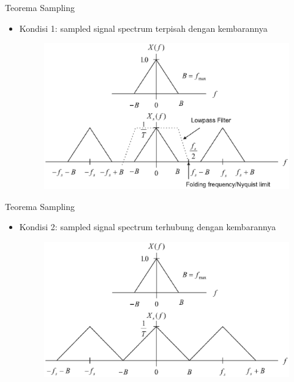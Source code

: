 \documentclass[pdflatex,compress,mathserif]{beamer}
\begin{document}
\begin{frame}{Teorema Sampling}
    \begin{itemize}
        \item Kondisi 1: sampled signal spectrum terpisah dengan kembarannya
        \begin{figure}
            \includegraphics[width=\linewidth]{./img/img09}
            \label{img:09}
        \end{figure}
    \end{itemize}
\end{frame}

\begin{frame}{Teorema Sampling}
    \begin{itemize}
        \item Kondisi 2: sampled signal spectrum terhubung dengan kembarannya
        \begin{figure}
            \includegraphics[width=\linewidth]{./img/img10}
        \end{figure}
    \end{itemize}
\end{frame}
\end{document}
